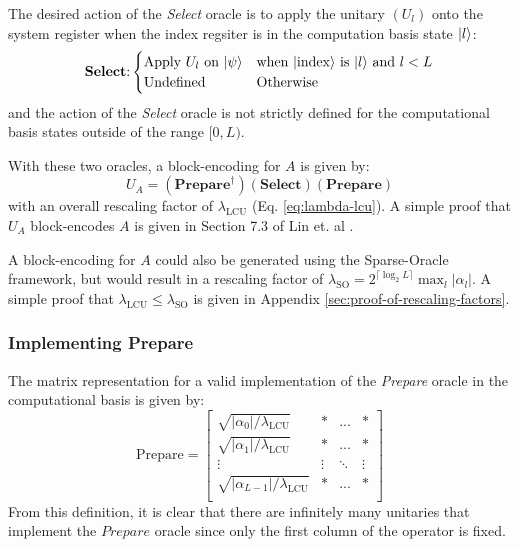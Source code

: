 The desired action of the \textit{Select} oracle is to apply the unitary $(U_l)$ onto the system register when the index regsiter is in the computation basis state $\ket{l}$:
\begin{equation}
    \label{eq:select}
    \textbf{Select}\text{:} 
    \begin{cases} 
        \text{Apply $U_l$ on $\ket{\psi}$} & \text{when $\ket{\text{index}}$ is $\ket{l}$ and $l < L$} \\
        \text{Undefined} & \text{Otherwise} \\
    \end{cases}
\end{equation}
and the action of the \textit{Select} oracle is not strictly defined for the computational basis states outside of the range $[0, L)$.

With these two oracles, a block-encoding for $A$ is given by:
\begin{equation}
    \label{eq:lcu-be}
    U_A = (\textbf{Prepare}^\dagger) (\textbf{Select}) (\textbf{Prepare})
\end{equation}
with an overall rescaling factor of $\lambda_\text{LCU}$ (Eq. \ref{eq:lambda-lcu}).
A simple proof that $U_A$ block-encodes $A$ is given in Section 7.3 of Lin et. al \cite{lin2022lecture}.

A block-encoding for $A$ could also be generated using the Sparse-Oracle framework, but would result in a rescaling factor of $\lambda_\text{SO} = 2^{\lceil \log_2L \rceil} \max_l |\alpha_l|$.
A simple proof that $\lambda_\text{LCU} \leq \lambda_\text{SO}$ is given in Appendix \ref{sec:proof-of-rescaling-factors}.

\subsubsection{Implementing \textbf{Prepare}}

The matrix representation for a valid implementation of the \textit{Prepare} oracle in the computational basis is given by:
\begin{equation}
    \text{Prepare} = \begin{bmatrix}
        \sqrt{|\alpha_0| / \lambda_\text{LCU}} & * & ... & * \\
        \sqrt{|\alpha_1| / \lambda_\text{LCU}} & * & ... & * \\
        \vdots & \vdots & \ddots & \vdots \\
        \sqrt{|\alpha_{L-1} |/ \lambda_\text{LCU}} & * & ... & * \\
    \end{bmatrix}
\end{equation}
From this definition, it is clear that there are infinitely many unitaries that implement the $\textit{Prepare}$ oracle since only the first column of the operator is fixed.

